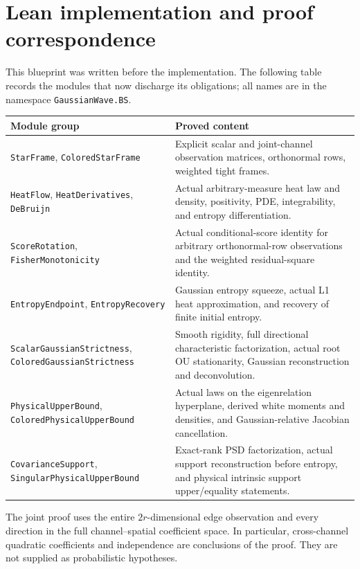 \documentclass[11pt]{article}
\begin{document}
\section{Lean implementation and proof correspondence}
This blueprint was written before the implementation. The following table
records the modules that now discharge its obligations; all names are in
the namespace \texttt{GaussianWave.BS}.
\begin{center}\small
\begin{tabular}{>{\raggedright\arraybackslash}p{.39\linewidth}>{\raggedright\arraybackslash}p{.52\linewidth}}
\toprule
Module group & Proved content\\\midrule
\texttt{StarFrame}, \texttt{ColoredStarFrame} & Explicit scalar and joint-channel observation matrices, orthonormal rows, weighted tight frames.\\[4pt]
\texttt{HeatFlow}, \texttt{HeatDerivatives}, \texttt{DeBruijn} & Actual arbitrary-measure heat law and density, positivity, PDE, integrability, and entropy differentiation.\\[4pt]
\texttt{ScoreRotation}, \texttt{FisherMonotonicity} & Actual conditional-score identity for arbitrary orthonormal-row observations and the weighted residual-square identity.\\[4pt]
\texttt{EntropyEndpoint}, \texttt{EntropyRecovery} & Gaussian entropy squeeze, actual L1 heat approximation, and recovery of finite initial entropy.\\[4pt]
\texttt{ScalarGaussianStrictness}, \texttt{ColoredGaussianStrictness} & Smooth rigidity, full directional characteristic factorization, actual root OU stationarity, Gaussian reconstruction and deconvolution.\\[4pt]
\texttt{PhysicalUpperBound}, \texttt{ColoredPhysicalUpperBound} & Actual laws on the eigenrelation hyperplane, derived white moments and densities, and Gaussian-relative Jacobian cancellation.\\[4pt]
\texttt{CovarianceSupport}, \texttt{SingularPhysicalUpperBound} & Exact-rank PSD factorization, actual support reconstruction before entropy, and physical intrinsic support upper/equality statements.\\
\bottomrule
\end{tabular}
\end{center}
The joint proof uses the entire $2r$-dimensional edge observation and every
direction in the full channel--spatial coefficient space. In particular,
cross-channel quadratic coefficients and independence are conclusions of
the proof. They are not supplied as probabilistic hypotheses.
\end{document}
